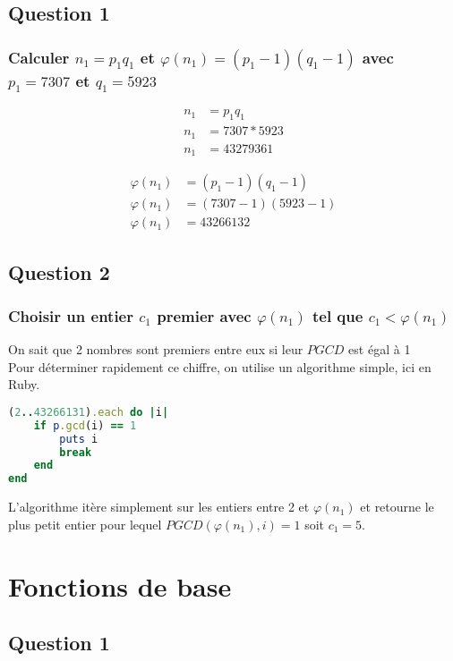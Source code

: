 \documentclass[a4paper,10pt]{article}
\begin{document}
\subsection{Question 1}
\subsubsection{Calculer $n_1 = p_1 q_1$ et $\varphi(n_1) = (p_1 - 1)(q_1 - 1)$ avec $p_1 = 7307$ et $q_1 = 5923$}

\begin{align*}
n_1 &= p_1 q_1\\
n_1 &= 7307 * 5923\\
n_1 &= 43279361
\end{align*}

\begin{align*}
\varphi(n_1) &= (p_1 - 1)(q_1 - 1)\\
\varphi(n_1) &= (7307 - 1)(5923 - 1)\\
\varphi(n_1) &= 43266132
\end{align*}

\subsection{Question 2}
\subsubsection{Choisir un entier $c_1$ premier avec $\varphi(n_1)$ tel que $c_1 < \varphi(n_1)$}
On sait que 2 nombres sont premiers entre eux si leur $PGCD$ est égal à 1\\
Pour déterminer rapidement ce chiffre, on utilise un algorithme simple, ici en Ruby.\\
\begin{lstlisting}[language=Ruby]
(2..43266131).each do |i|
	if p.gcd(i) == 1
		puts i
		break
	end
end
\end{lstlisting}
L'algorithme itère simplement sur les entiers entre 2 et $\varphi(n_1)$ et retourne le plus petit entier pour lequel $PGCD(\varphi(n_1), i) = 1$ soit $c_1 = 5$.

\clearpage
\section{Fonctions de base}
\subsection{Question 1}
\end{document}
